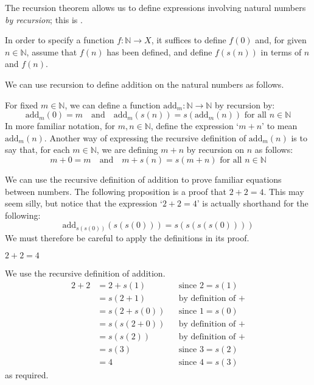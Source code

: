 The recursion theorem allows us to define expressions involving natural numbers \textit{by recursion}; this is .

\begin{strategy}
\label{strDefinitionByRecursion}
In order to specify a function $f : \mathbb{N} \to X$, it suffices to define $f(0)$ and, for given $n \in \mathbb{N}$, assume that $f(n)$ has been defined, and define $f(s(n))$ in terms of $n$ and $f(n)$.
\end{strategy}

\begin{example}
We can use recursion to define addition on the natural numbers as follows.

For fixed $m \in \mathbb{N}$, we can define a function $\mathrm{add}_m : \mathbb{N} \to \mathbb{N}$ by recursion by:
\[ \mathrm{add}_m(0) = m \quad \text{and} \quad \mathrm{add}_m(s(n)) = s(\mathrm{add}_m(n)) \text{ for all } n \in \mathbb{N} \]
In more familiar notation, for $m,n \in \mathbb{N}$, define the expression `$m+n$' to mean $\mathrm{add}_m(n)$. Another way of expressing the recursive definition of $\mathrm{add}_m(n)$ is to say that, for each $m \in \mathbb{N}$, we are defining $m+n$ by recursion on $n$ as follows:
\[ m+0 = m \quad \text{and} \quad m+s(n) = s(m+n) \text{ for all } n \in \mathbb{N} \]
\end{example}

We can use the recursive definition of addition to prove familiar equations between numbers. The following proposition is a proof that $2+2=4$. This may seem silly, but notice that the expression `$2+2=4$' is actually shorthand for the following:
\[ \mathrm{add}_{s(s(0))} (s(s(0))) = s(s(s(s(0)))) \]
We must therefore be careful to apply the definitions in its proof.

\begin{proposition}
\label{propTwoPlusTwoEqualsFour}
$2+2=4$
\end{proposition}

\begin{cproof}
We use the recursive definition of addition.
\begin{align*}
2 + 2 &= 2 + s(1) && \text{since $2=s(1)$} \\
&= s(2+1) && \text{by definition of $+$} \\
&= s(2+s(0)) && \text{since $1=s(0)$} \\
&= s(s(2+0)) && \text{by definition of $+$} \\
&= s(s(2)) && \text{by definition of $+$} \\
&= s(3) && \text{since $3=s(2)$} \\
&= 4 && \text{since $4=s(3)$}
\end{align*}
as required.
\end{cproof}

